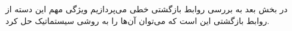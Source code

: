 
\p
در بخش بعد به بررسی روابط بازگشتی خطی می‌پردازیم
ویژگی مهم این دسته از روابط بازگشتی این است 
که می‌توان آن‌ها را به روشی سیستماتیک حل کرد.



